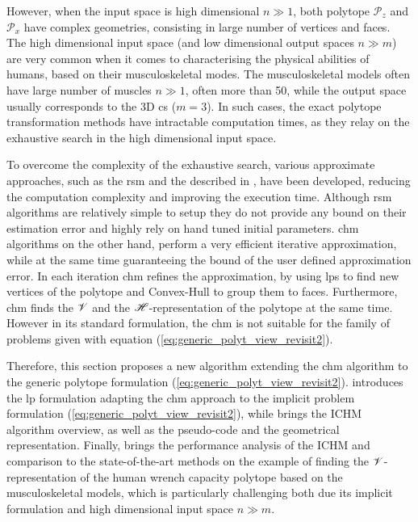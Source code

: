 However, when the input space is high dimensional $n\gg1$, both polytope $\mathcal{P}_z$ and $\mathcal{P}_x$ have complex geometries, consisting in large number of vertices and faces. The high dimensional input space (and low dimensional output spaces $n\gg m$) are very common when it comes to characterising the physical abilities of humans, based on their musculoskeletal modes. The musculoskeletal models often have large number of muscles $n\gg1$, often more than 50, while the output space usually corresponds to the 3D \gls{cs} ($m=3$). In such cases, the exact polytope transformation methods have intractable computation times, as they relay on the exhaustive search in the high dimensional input space.

To overcome the complexity of the exhaustive search, various approximate approaches, such as the \gls{rsm}  \cite{agarwal1993ray} and the  \cite{lassez1992quantifier} described in , have been developed, reducing the computation complexity and improving the execution time. 
Although \gls{rsm} algorithms are relatively simple to setup they do not provide any bound on their estimation error and highly rely on hand tuned initial parameters. 
\gls{chm} \cite{lassez1992quantifier} algorithms on the other hand, perform a very efficient iterative approximation,  while at the same time guaranteeing the bound of the user defined approximation error. In each iteration \gls{chm} refines the approximation, by using \glspl{lp} to find new vertices of the polytope and Convex-Hull to group them to faces. Furthermore, \gls{chm} finds the $\mathscr{V}$ and the $\mathscr{H}$-representation of the polytope at the same time. However in its standard formulation, the \gls{chm} is not suitable for the family of problems given with equation (\ref{eq:generic_polyt_view_revisit2}). 

Therefore, this section proposes a new algorithm extending the \gls{chm} algorithm to the generic polytope formulation (\ref{eq:generic_polyt_view_revisit2}).  introduces the \gls{lp} formulation adapting the \gls{chm} approach to the implicit problem formulation (\ref{eq:generic_polyt_view_revisit2}), while  brings the ICHM algorithm overview, as well as the pseudo-code and the geometrical representation. Finally,  brings the performance analysis of the ICHM and comparison to the state-of-the-art methods on the example of finding the $\mathscr{V}$-representation of the human wrench capacity polytope based on the musculoskeletal models, which is particularly challenging both due its implicit formulation and high dimensional input space $n\gg m$.

